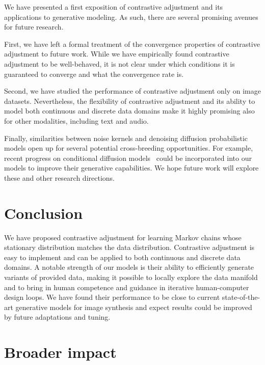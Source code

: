 \documentclass[10pt,twocolumn,letterpaper]{article}
\begin{document}
We have presented a first exposition of contrastive adjustment and its applications to generative modeling.
As such, there are several promising avenues for future research.

First, we have left a formal treatment of the convergence properties of contrastive adjustment to future work.
While we have empirically found contrastive adjustment to be well-behaved, it is not clear under which conditions it is guaranteed to converge and what the convergence rate is.

Second, we have studied the performance of contrastive adjustment only on image datasets.
Nevertheless, the flexibility of contrastive adjustment and its ability to model both continuous and discrete data domains make it highly promising also for other modalities, including text and audio.

Finally, similarities between noise kernels and denoising diffusion probabilistic models open up for several potential cross-breeding opportunities.
For example, recent progress on conditional diffusion models~\cite{wang22ddnm,zhang23controlnet} could be incorporated into our models to improve their generative capabilities.
We hope future work will explore these and other research directions.


\section{Conclusion}

We have proposed contrastive adjustment for learning Markov chains whose stationary distribution matches the data distribution.
Contrastive adjustment is easy to implement and can be applied to both continuous and discrete data domains.
A notable strength of our models is their ability to efficiently generate variants of provided data, making it possible to locally explore the data manifold and to bring in human competence and guidance in iterative human-computer design loops.
We have found their performance to be close to current state-of-the-art generative models for image synthesis and expect results could be improved by future adaptations and tuning.


\section*{Broader impact}
\end{document}
